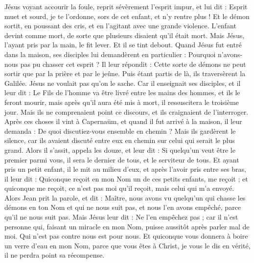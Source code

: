 \begin{multicols}{2}
Jésus voyant accourir la foule, reprit sévèrement l’esprit impur, et lui dit : Esprit muet et sourd, je te l’ordonne, sors de cet enfant, et n'y rentre plus !
Et le démon sortit, en poussant des cris, et en l’agitant avec une grande violence. L’enfant devint comme mort, de sorte que plusieurs disaient qu’il était mort.
Mais Jésus, l'ayant pris par la main, le fit lever. Et il se tint debout.
Quand Jésus fut entré dans la maison, ses disciples lui demandèrent en particulier : Pourquoi n’avons-nous pas pu chasser cet esprit ?
Il leur répondit : Cette sorte de démons ne peut sortir que par la prière et par le jeûne.
Puis étant partis de là, ils traversèrent la Galilée. Jésus ne voulait pas qu’on le sache.
Car il enseignait ses disciples, et il leur dit : Le Fils de l'homme va être livré entre les mains des hommes, et ils le feront mourir, mais après qu'il aura été mis à mort, il ressuscitera le troisième jour.
Mais ils ne comprenaient point ce discours, et ils craignaient de l'interroger.
Après ces choses il vint à Capernaüm, et quand il fut arrivé à la maison, il leur demanda : De quoi discutiez-vous ensemble en chemin ?
Mais ils gardèrent le silence, car ils avaient discuté entre eux en chemin sur celui qui serait le plus grand.
Alors il s’assit, appela les douze, et leur dit : Si quelqu'un veut être le premier parmi vous, il sera le dernier de tous, et le serviteur de tous.
Et ayant pris un petit enfant, il le mit au milieu d'eux, et après l'avoir pris entre ses bras, il leur dit :
Quiconque reçoit en mon Nom un de ces petits enfants, me reçoit ; et quiconque me reçoit, ce n'est pas moi qu’il reçoit, mais celui qui m'a envoyé.
Alors Jean prit la parole, et dit : Maître, nous avons vu quelqu'un qui chasse les démons en ton Nom et qui ne nous suit pas, et nous l'en avons empêché, parce qu'il ne nous suit pas.
Mais Jésus leur dit : Ne l'en empêchez pas ; car il n’est personne qui, faisant un miracle en mon Nom, puisse aussitôt après parler mal de moi.
Qui n'est pas contre nous est pour nous.
Et quiconque vous donnera à boire un verre d'eau en mon Nom, parce que vous êtes à Christ, je vous le dis en vérité, il ne perdra point sa récompense.

\end{multicols}
